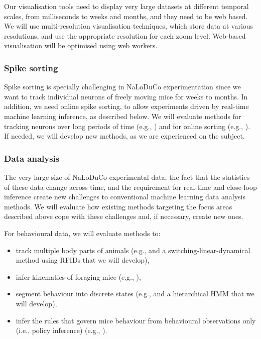 Our visualisation tools
need to display very large datasets at different temporal scales, from
milliseconds to weeks and months, and they need to be web based.
%
We will use multi-resolution visualisation techniques, which store data at
various resolutions, and use the appropriate resolution for each zoom level.
%
Web-based visualisation will be optimised using web workers.

\subsubsection{Spike sorting}

Spike sorting is specially challenging in NaLoDuCo experimentation since we
want to track individual neurons of freely moving mice for weeks to months.
%
In addition, we need online spike sorting, to allow experiments driven
by real-time machine learning inference, as described below.
%
We will evaluate methods for tracking neurons over long periods of time
(e.g., \cite{yuanEtAl24}) and for online sorting
(e.g., \cite{rutishauserEtAl06}). If needed, we will develop
new methods, as we are experienced on the subject.

\subsubsection{Data analysis}

The very large size of NaLoDuCo experimental data, the fact that the statistics
of these data change across time, and the requirement for real-time and
close-loop inference create new challenges to conventional machine learning
data analysis methods.
%
We will evaluate how existing methods targeting the focus areas described above
cope with these challenges and, if necessary, create new ones.

For behavioural data, we will evaluate methods to:

\begin{itemize}

    \item track multiple body parts of
animals (e.g., \cite{mathisEtAl18} and a switching-linear-dynamical method using RFIDs that
we will develop),

    \item infer kinematics of foraging mice (e.g.,
        \cite{ldspython,challaEtAl11}),

    \item segment behaviour into discrete states (e.g., \cite{wiltschkoEtAl15} and a hierarchical HMM
that we will develop),

    \item infer the rules that govern mice behaviour from behavioural observations
        only (i.e., policy inference) (e.g., \cite{zhuEtAl23}).

\end{itemize}

